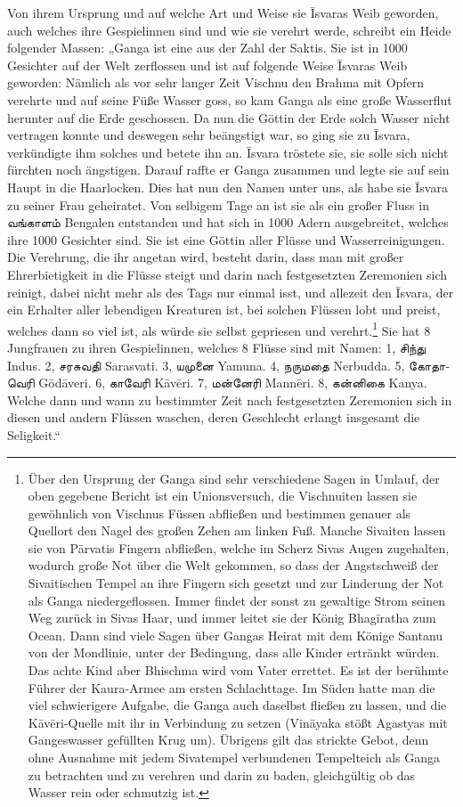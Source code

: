 \documentclass{article}
\newcommand{\TamilText}[1]{\texttamil{#1}}
\newcommand{\tam}[1]{\TamilText{#1}}
\begin{document}
Von ihrem Ursprung und auf welche Art und Weise sie \={I}svaras Weib geworden, auch welches ihre Gespielinnen sind und wie sie verehrt werde, schreibt ein Heide folgender Massen: „Ganga ist eine aus der Zahl der Saktis. Sie ist in 1000 Gesichter auf der Welt zerflossen und ist auf folgende Weise \={I}svaras Weib geworden: Nämlich als vor sehr langer Zeit Vischnu den Brahma mit Opfern verehrte und auf seine Füße Wasser goss, so kam Ganga als eine große Wasserflut herunter auf die Erde geschossen. Da nun die Göttin der Erde solch Wasser nicht vertragen konnte und deswegen sehr beängstigt war, so ging sie zu \={I}svara, verkündigte ihm solches und betete ihn an. \={I}svara tröstete sie, sie solle sich nicht fürchten noch ängstigen. Darauf raffte er Ganga zusammen und legte sie auf sein Haupt in die Haarlocken. Dies hat nun den Namen unter uns, als habe sie \={I}svara zu seiner Frau geheiratet. Von selbigem Tage an ist sie als ein großer Fluss in \tam{வங்காளம்} Bengalen entstanden und hat sich in 1000 Adern ausgebreitet, welches ihre 1000 Gesichter sind. Sie ist eine Göttin aller Flüsse und Wasserreinigungen. Die Verehrung, die ihr angetan wird, besteht darin, dass man mit großer Ehrerbietigkeit in die Flüsse steigt und darin nach festgesetzten Zeremonien sich reinigt, dabei nicht mehr als des Tags nur einmal isst, und allezeit den \={I}svara, der ein Erhalter aller lebendigen Kreaturen ist, bei solchen Flüssen lobt und preist, welches dann so viel ist, als würde sie selbst gepriesen und verehrt.\footnote{Über den Ursprung der Ganga sind sehr verschiedene Sagen in Umlauf, der oben gegebene Bericht ist ein Unionsversuch, die Vischnuiten lassen sie gewöhnlich von Vischnus Füssen abfließen und bestimmen genauer als Quellort den Nagel des großen Zehen am linken Fuß. Manche Sivaiten lassen sie von P\={a}rvatis Fingern abfließen, welche im Scherz Sivas Augen zugehalten, wodurch große Not über die Welt gekommen, so dass der Angstschweiß der Sivaitischen Tempel an ihre Fingern sich gesetzt und zur Linderung der Not als Ganga niedergeflossen. Immer findet der sonst zu gewaltige Strom seinen Weg zurück in Sivas Haar, und immer leitet sie der König Bhag\={i}ratha zum Ocean. Dann sind viele Sagen über Gangas Heirat mit dem Könige Santanu von der Mondlinie, unter der Bedingung, dass alle Kinder ertränkt würden. Das achte Kind aber Bhischma wird vom Vater errettet. Es ist der berühmte Führer der Kaura-Armee am ersten Schlachttage. Im Süden hatte man die viel schwierigere Aufgabe, die Ganga auch daselbst fließen zu lassen, und die K\={a}v\={e}ri-Quelle mit ihr in Verbindung zu setzen (Vin\={a}yaka stößt Agastyas mit Gangeswasser gefüllten Krug um). Übrigens gilt das strickte Gebot, denn ohne Ausnahme mit jedem Sivatempel verbundenen Tempelteich als Ganga zu betrachten und zu verehren und darin zu baden, gleichgültig ob das Wasser rein oder schmutzig ist.} Sie hat 8 Jungfrauen zu ihren Gespielinnen, welches 8 Flüsse sind mit Namen: 1, \tam{சிந்து} Indus. 2, \tam{சரசுவதி} Sarasvati. 3, \tam{யமுனை} Yamuna. 4, \tam{நருமதை} Nerbudda. 5, \tam{கோதாவெரி} G\={o}d\={a}veri. 6, \tam{காவேரி} K\={a}v\={e}ri. 7, \tam{மன்னேரி} Mann\={e}ri. 8, \tam{கன்னிகை} Kanya. Welche dann und wann zu bestimmter Zeit nach festgesetzten Zeremonien sich in diesen und andern Flüssen waschen, deren Geschlecht erlangt insgesamt die Seligkeit.“
\end{document}
